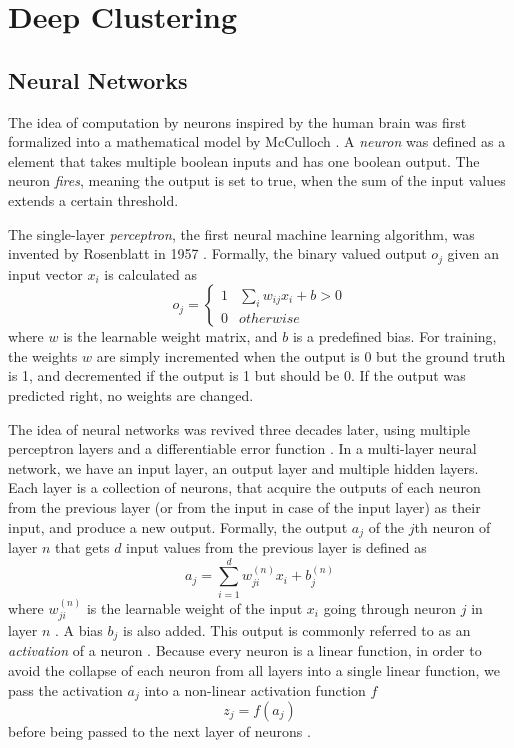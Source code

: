 \section{Deep Clustering}
\subsection{Neural Networks} \label{Neural Networks}

The idea of computation by neurons inspired by the human brain was first formalized into a mathematical model by McCulloch \cite{neural_network_1943}. A \textit{neuron} was defined as a element that takes multiple boolean inputs and has one boolean output. The neuron \textit{fires}, meaning the output is set to true, when the sum of the input values extends a certain threshold.

The single-layer \textit{perceptron}, the first neural machine learning algorithm, was invented by Rosenblatt in 1957 \cite{perceptron}. Formally, the binary valued output $o_j$ given an input vector $x_i$ is calculated as
$$o_j = 
\begin{cases}
    1 & \sum_i w_{ij}x_i + b > 0\\
    0 & otherwise
\end{cases}
$$
where $w$ is the learnable weight matrix, and $b$ is a predefined bias. For training, the weights $w$ are simply incremented when the output is 0 but the ground truth is 1, and decremented if the output is 1 but should be 0. If the output was predicted right, no weights are changed.

The idea of neural networks was revived three decades later, using multiple perceptron layers and a differentiable error function \cite{hidden_layer_backprop}. In a multi-layer neural network, we have an input layer, an output layer and multiple hidden layers. Each layer is a collection of neurons, that acquire the outputs of each neuron from the previous layer (or from the input in case of the input layer) as their input, and produce a new output. Formally, the output $a_j$ of the $j$th neuron of layer $n$ that gets $d$ input values from the previous layer is defined as
$$a_j = \sum^d_{i=1}w_{ji}^{(n)}x_i + b_j^{(n)}$$
where $w_{ji}^{(n)}$ is the learnable weight of the input $x_i$ going through neuron $j$ in layer $n$ \cite{neural_networks_pattern_recognition}. A bias $b_j$ is also added. This output is commonly referred to as an \textit{activation} of a neuron \cite{neural_networks_pattern_recognition}. Because every neuron is a linear function, in order to avoid the collapse of each neuron from all layers into a single linear function, we pass the activation $a_j$ into a non-linear activation function $f$
$$z_j = f(a_j)$$
before being passed to the next layer of neurons \cite{activation_functions}.

